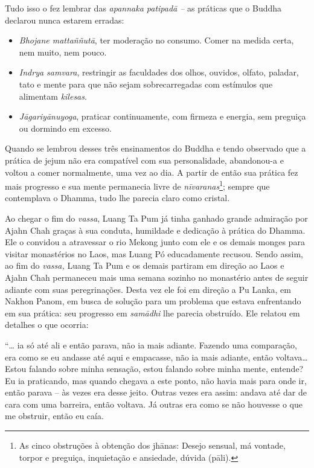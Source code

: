 Tudo isso o fez lembrar das \emph{apannaka patipadā --} as práticas que
o Buddha declarou nunca estarem erradas:

\begin{itemize}
\item
  \emph{Bhojane mattaññutā}, ter moderação no consumo. Comer na medida
  certa, nem muito, nem pouco.
\item
  \emph{Indrya samvara}, restringir as faculdades dos olhos, ouvidos,
  olfato, paladar, tato e mente para que não sejam sobrecarregadas com
  estímulos que alimentam \emph{kilesas}.
\item
  \emph{Jāgariyānuyoga}, praticar continuamente, com firmeza e energia,
  sem preguiça ou dormindo em excesso.
\end{itemize}

Quando se lembrou desses três ensinamentos do Buddha e tendo observado
que a prática de jejum não era compatível com sua personalidade,
abandonou-a e voltou a comer normalmente, uma vez ao dia. A partir de
então sua prática fez mais progresso e sua mente permanecia livre de
\emph{nīvaranas}\footnote{As cinco obstruções à obtenção dos jhānas:
  Desejo sensual, má vontade, torpor e preguiça, inquietação e
  ansiedade, dúvida (pāli).}; sempre que contemplava o Dhamma, tudo lhe
parecia claro como cristal.

Ao chegar o fim do \emph{vassa}, Luang Ta Pum já tinha ganhado grande
admiração por Ajahn Chah graças à sua conduta, humildade e dedicação à
prática do Dhamma. Ele o convidou a atravessar o rio Mekong junto com
ele e os demais monges para visitar monastérios no Laos, mas Luang Pó
educadamente recusou. Sendo assim, ao fim do \emph{vassa,} Luang Ta Pum
e os demais partiram em direção ao Laos e Ajahn Chah permaneceu mais uma
semana sozinho no monastério antes de seguir adiante com suas
peregrinações. Desta vez ele foi em direção a Pu Lanka, em Nakhon Panom,
em busca de solução para um problema que estava enfrentando em sua
prática: seu progresso em \emph{samādhi} lhe parecia obstruído. Ele
relatou em detalhes o que ocorria:

``\ldots{} ia só até ali e então parava, não ia mais adiante. Fazendo
uma comparação, era como se eu andasse até aqui e empacasse, não ia mais
adiante, então voltava\ldots{} Estou falando sobre minha sensação, estou
falando sobre minha mente, entende? Eu ia praticando, mas quando chegava
a este ponto, não havia mais para onde ir, então parava -- às vezes era
desse jeito. Outras vezes era assim: andava até dar de cara com uma
barreira, então voltava. Já outras era como se não houvesse o que me
obstruir, então eu caía.

